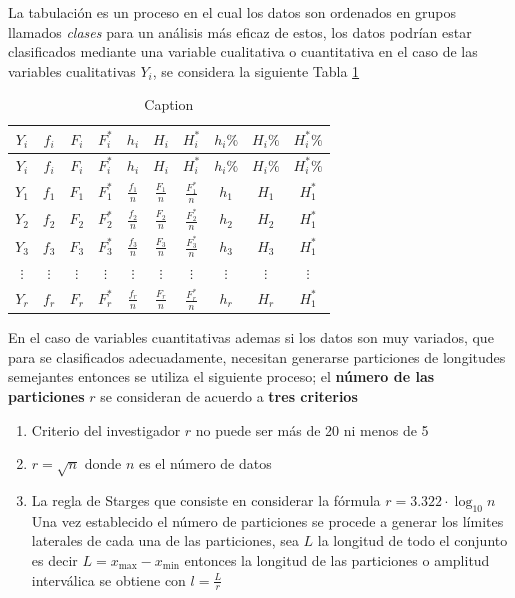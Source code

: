 \documentclass[10pt,]{krantz}
\theoremstyle{definition}
\theoremstyle{definition}
\theoremstyle{definition}
\theoremstyle{definition}
\theoremstyle{remark}
\begin{document}
La tabulación es un proceso en el cual los datos son ordenados en grupos llamados \emph{clases} para un análisis más eficaz de estos, los datos podrían estar clasificados mediante una variable cualitativa o cuantitativa en el caso de las variables cualitativas \(Y_i\), se considera la siguiente Tabla \ref{tab:ww}

\begin{longtable}[]{@{}cccccccccc@{}}
\caption{\label{tab:ww} Caption}\tabularnewline
\toprule
\(Y_i\) & \(f_i\) & \(F_i\) & \(F_i^*\) & \(h_i\) & \(H_i\) & \(H_i^*\) & \(h_i\%\) & \(H_i\%\) & \(H_i^*\%\)\tabularnewline
\midrule
\endfirsthead
\toprule
\(Y_i\) & \(f_i\) & \(F_i\) & \(F_i^*\) & \(h_i\) & \(H_i\) & \(H_i^*\) & \(h_i\%\) & \(H_i\%\) & \(H_i^*\%\)\tabularnewline
\midrule
\endhead
\(Y_1\) & \(f_1\) & \(F_1\) & \(F_1^*\) & \(\frac{f_1}{n}\) & \(\frac{F_1}{n}\) & \(\frac{F_1^*}{n}\) & \(h_1\) & \(H_1\) & \(H_1^*\)\tabularnewline
\(Y_2\) & \(f_2\) & \(F_2\) & \(F_2^*\) & \(\frac{f_2}{n}\) & \(\frac{F_2}{n}\) & \(\frac{F_2^*}{n}\) & \(h_2\) & \(H_2\) & \(H_1^*\)\tabularnewline
\(Y_3\) & \(f_3\) & \(F_3\) & \(F_3^*\) & \(\frac{f_3}{n}\) & \(\frac{F_3}{n}\) & \(\frac{F_3^*}{n}\) & \(h_3\) & \(H_3\) & \(H_1^*\)\tabularnewline
\(\vdots\) & \(\vdots\) & \(\vdots\) & \(\vdots\) & \(\vdots\) & \(\vdots\) & \(\vdots\) & \(\vdots\) & \(\vdots\) & \(\vdots\)\tabularnewline
\(Y_r\) & \(f_r\) & \(F_r\) & \(F_r^*\) & \(\frac{f_r}{n}\) & \(\frac{F_r}{n}\) & \(\frac{F_r^*}{n}\) & \(h_r\) & \(H_r\) & \(H_1^*\)\tabularnewline
\bottomrule
\end{longtable}

En el caso de variables cuantitativas ademas si los datos son muy variados, que para se clasificados adecuadamente, necesitan generarse particiones de longitudes semejantes entonces se utiliza el siguiente proceso; el \textbf{número de las particiones} \(r\) se consideran de acuerdo a \textbf{tres criterios}

\begin{enumerate}
\def\labelenumi{\arabic{enumi}.}
\item
  Criterio del investigador \(r\) no puede ser más de 20 ni menos de 5
\item
  \(r=\sqrt{n}\) donde \(n\) es el número de datos
\item
  La regla de Starges que consiste en considerar la fórmula \(r=3.322\cdot\log_{10} n\) Una vez establecido el número de particiones se procede a generar los límites laterales de cada una de las particiones, sea \(L\) la longitud de todo el conjunto es decir \(L=x_{\text{max}}-x_{\text{min}}\) entonces la longitud de las particiones o amplitud interválica se obtiene con \(l=\frac{L}{r}\)
\end{enumerate}
\end{document}
